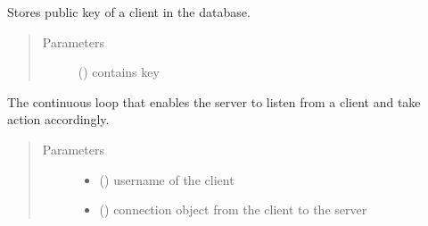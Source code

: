 \documentclass[letterpaper,10pt,english]{sphinxmanual}
\begin{document}

\begin{fulllineitems}
\label{\detokenize{main_server:main_server.store_key}}
Stores public key of a client in the database.
\begin{quote}\begin{description}
\item[{Parameters}] \leavevmode
{} () \textendash{} contains key

\end{description}\end{quote}

\end{fulllineitems}


\begin{fulllineitems}
\label{\detokenize{main_server:main_server.talk}}
The continuous loop that enables the server to listen from a client and take action accordingly.
\begin{quote}\begin{description}
\item[{Parameters}] \leavevmode\begin{itemize}
\item {} 
 () \textendash{} username of the client

\item {} 
 () \textendash{} connection object from the client to the server

\end{itemize}

\end{description}\end{quote}

\end{fulllineitems}
\end{document}
